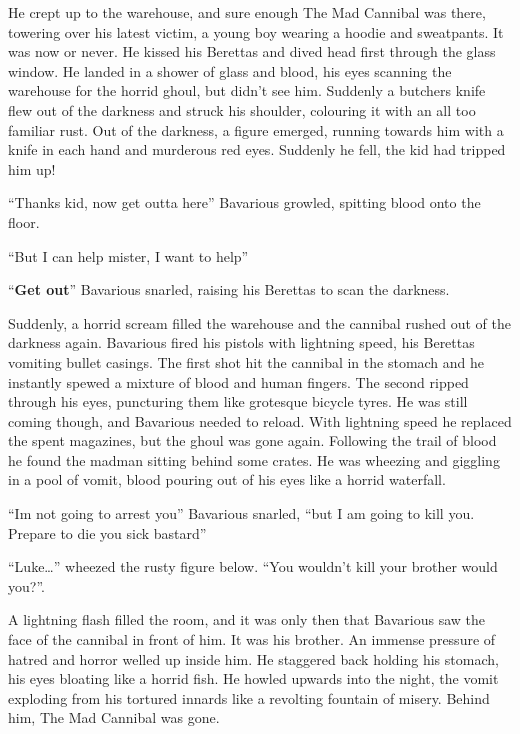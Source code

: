 He crept up to the warehouse, and sure enough The Mad Cannibal was
there, towering over his latest victim, a young boy wearing a
hoodie and sweatpants. It was now or never. He kissed his Berettas
and dived head first through the glass window. He landed in a
shower of glass and blood, his eyes scanning the warehouse for the
horrid ghoul, but didn't see him. Suddenly a butchers knife
flew out of the darkness and struck his shoulder, colouring it with
an all too familiar rust. Out of the darkness, a figure emerged,
running towards him with a knife in each hand and murderous red
eyes. Suddenly he fell, the kid had tripped him up!



``Thanks kid, now get outta here'' Bavarious growled,
spitting blood onto the floor.

``But I can help mister, I want to help''

``{\bf Get out}'' Bavarious snarled, raising his Berettas to scan the
darkness.



Suddenly, a horrid scream filled the warehouse and the cannibal
rushed out of the darkness again. Bavarious fired his pistols with
lightning speed, his Berettas vomiting bullet casings. The first
shot hit the cannibal in the stomach and he instantly spewed a
mixture of blood and human fingers. The second ripped through his
eyes, puncturing them like grotesque bicycle tyres. He was still
coming though, and Bavarious needed to reload. With lightning speed
he replaced the spent magazines, but the ghoul was gone again.
Following the trail of blood he found the madman sitting behind
some crates. He was wheezing and giggling in a pool of vomit, blood
pouring out of his eyes like a horrid waterfall.



``Im not going to arrest you'' Bavarious snarled,
``but I am going to kill you. Prepare to die you sick
bastard''



``Luke{\ldots}'' wheezed the rusty figure below.
``You wouldn't kill your brother would
you?''.



A lightning flash filled the room, and it was only then that
Bavarious saw the face of the cannibal in front of him. It was his
brother. An immense pressure of hatred and horror welled up inside
him. He staggered back holding his stomach, his eyes bloating like
a horrid fish. He howled upwards into the night, the vomit
exploding from his tortured innards like a revolting fountain of
misery. Behind him, The Mad Cannibal was gone.






